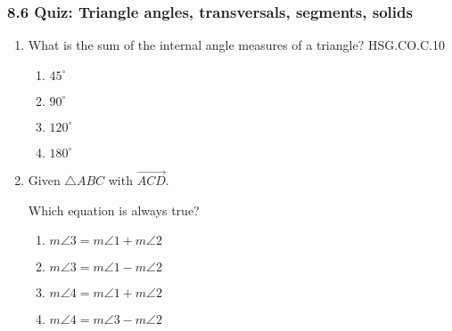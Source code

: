 

\fancyhead[LE]{\thepage}



\subsubsection*{8.6 Quiz: Triangle angles, transversals, segments, solids}
\begin{enumerate}
\item What is the sum of the internal angle measures of a triangle? \hfill HSG.CO.C.10
\begin{multicols}{2}
\begin{enumerate}
  \item $45^\circ$
  \item $90^\circ$
  \item $120^\circ$
  \item $180^\circ$
\end{enumerate}
\end{multicols}

\item Given $\triangle ABC$ with $\overrightarrow{ACD}$.
\begin{center}
\end{center}
Which equation is always true?
\begin{multicols}{2}
\begin{enumerate}
  \item $m\angle 3 = m\angle 1 + m\angle 2$
  \item $m\angle 3 = m\angle 1 - m\angle 2$ 
  \item $m\angle 4 = m\angle 1 + m\angle 2$
  \item $m\angle 4 = m\angle 3 - m\angle 2$
\end{enumerate}
\end{multicols}


\end{enumerate}
